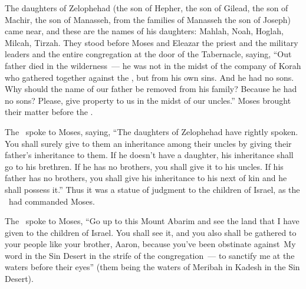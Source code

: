 
\begin{inparaenum}
   The daughters of Zelophehad (the son of Hepher, the son of Gilead, the son of Machir, the son of Manasseh, from the families of Manasseh the son of Joseph) came near, and these are the names of his daughters: Mahlah, Noah, Hoglah, Milcah, Tirzah.%
   They stood before Moses and Eleazar the priest and the military leaders and the entire congregation at the door of the Tabernacle, saying,%
   ``Out father died in the wilderness~--- he was not in the midst of the company of Korah who gathered together against the \lord, but from his own sins. And he had no sons.%
   Why should the name of our father be removed from his family? Because he had no sons? Please, give property to us in the midst of our uncles.''%
   Moses brought their matter before the \lord.%
  
   The \lord\ spoke to Moses, saying,%
   ``The daughters of Zelophehad have rightly spoken. You shall surely give to them an inheritance among their uncles by giving their father's inheritance to them.%
   If he doesn't have a daughter, his inheritance shall go to his brethren.%
   If he has no brothers, you shall give it to his uncles.%
   If his father has no brothers, you shall give his inheritance to his next of kin and he shall possess it.'' Thus it was a statue of judgment to the children of Israel, as the \lord\ had commanded Moses.%
  
   The \lord\ spoke to Moses, ``Go up to this Mount Abarim and see the land that I have given to the children of Israel.%
   You shall see it, and you also shall be gathered to your people like your brother, Aaron,%
   because you've been obstinate against\understood\ My word in the Sin Desert in the strife of the congregation~--- to sanctify me at the waters before their eyes'' (them being the waters of Meribah in Kadesh in the Sin Desert).%
  

\end{inparaenum}
